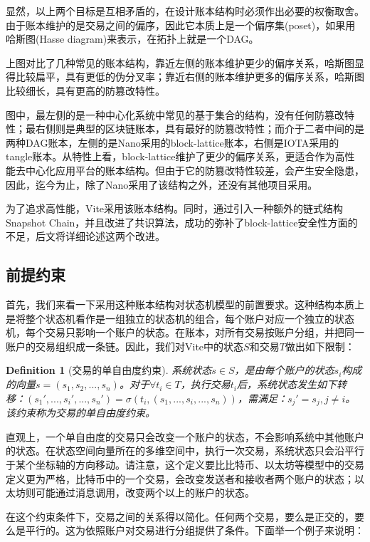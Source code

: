 \documentclass[UTF8,nofonts]{ctexart}
\newtheorem{definition}{Definition}[section]
\begin{document}
\begin{multicols}{2}
显然，以上两个目标是互相矛盾的，在设计账本结构时必须作出必要的权衡取舍。由于账本维护的是交易之间的偏序，因此它本质上是一个偏序集(poset)\cite{poset}，如果用哈斯图(Hasse diagram)\cite{hasse}来表示，在拓扑上就是一个DAG。

上图对比了几种常见的账本结构，靠近左侧的账本维护更少的偏序关系，哈斯图显得比较扁平，具有更低的伪分叉率；靠近右侧的账本维护更多的偏序关系，哈斯图比较细长，具有更高的防篡改特性。

图中，最左侧的是一种中心化系统中常见的基于集合的结构，没有任何防篡改特性；最右侧则是典型的区块链账本，具有最好的防篡改特性；而介于二者中间的是两种DAG账本，左侧的是Nano采用的block-lattice账本\cite{nano}，右侧是IOTA采用的tangle账本\cite{iota}。从特性上看，block-lattice维护了更少的偏序关系，更适合作为高性能去中心化应用平台的账本结构。但由于它的防篡改特性较差，会产生安全隐患，因此，迄今为止，除了Nano采用了该结构之外，还没有其他项目采用。

为了追求高性能，Vite采用该账本结构。同时，通过引入一种额外的链式结构Snapshot Chain，并且改进了共识算法，成功的弥补了block-lattice安全性方面的不足，后文将详细论述这两个改进。

\subsection{前提约束}
首先，我们来看一下采用这种账本结构对状态机模型的前置要求。这种结构本质上是将整个状态机看作是一组独立的状态机的组合，每个账户对应一个独立的状态机，每个交易只影响一个账户的状态。在账本，对所有交易按账户分组，并把同一账户的交易组织成一条链。因此，我们对Vite中的状态$S$和交易$T$做出如下限制：

\begin{definition}[交易的单自由度约束]
系统状态$s \in S$，是由每个账户的状态$s_{i}$构成的向量$s=(s_{1}, s_{2},...,s_{n})$。对于$\forall t_{i} \in T$，执行交易$t_{i}$后，系统状态发生如下转移：$({s_{1}}',..., {s_{i}}',...,{s_{n}}') = \sigma(t_{i}, (s_{1},..., s_{i},...,s_{n}))$，需满足：${s_{j}}'=s_{j} , j \neq i$。该约束称为交易的单自由度约束。
\end{definition}

直观上，一个单自由度的交易只会改变一个账户的状态，不会影响系统中其他账户的状态。在状态空间向量所在的多维空间中，执行一次交易，系统状态只会沿平行于某个坐标轴的方向移动。请注意，这个定义要比比特币、以太坊等模型中的交易定义更为严格，比特币中的一个交易，会改变发送者和接收者两个账户的状态；以太坊则可能通过消息调用，改变两个以上的账户的状态。

在这个约束条件下，交易之间的关系得以简化。任何两个交易，要么是正交的，要么是平行的。这为依照账户对交易进行分组提供了条件。下面举一个例子来说明：


\end{multicols}
\end{document}
